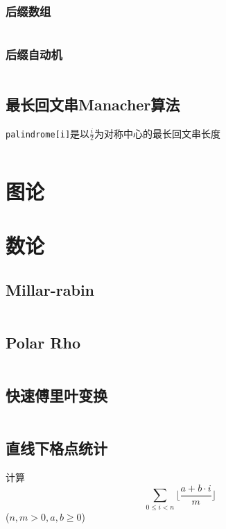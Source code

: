 \documentclass[a4paper]{article}
\newcommand{\cppcode}[1]{
    \inputminted[mathescape]{cpp}{source/#1}
}
\begin{document}
\subsubsection{后缀数组}

\cppcode{suffix-array.cpp}

\subsubsection{后缀自动机}

\cppcode{suffix-automaton.cpp}

\subsection{最长回文串Manacher算法}

\texttt{palindrome[i]}是以$\frac{i}{2}$为对称中心的最长回文串长度

\cppcode{manacher.cpp}

\section{图论}

\section{数论}

\subsection{Millar-rabin}

\cppcode{millar-rabin.cpp}

\subsection{Polar Rho}

\cppcode{pollard-rho.cpp}

\subsection{快速傅里叶变换}

\cppcode{fast-fourier-transform.cpp}

\subsection{直线下格点统计}

计算$$\sum_{0 \leq i < n} \lfloor \frac{a + b \cdot i}{m} \rfloor$$
($n, m > 0, a, b \geq 0$)
\cppcode{lattice-count.cpp}
\end{document}
